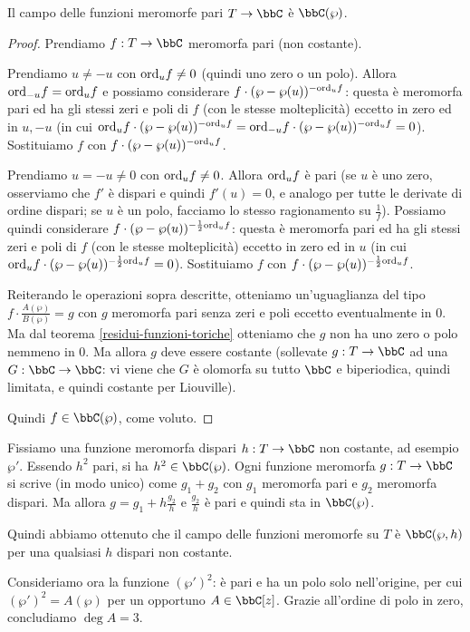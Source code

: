 \begin{teorema}
Il campo delle funzioni meromorfe pari $T\rar\bbC$ è $\bbC(\wp)$.
\end{teorema}
\begin{proof}
Prendiamo $f:T\rar\bbC$ meromorfa pari (non costante).

Prendiamo $u\not=-u$ con $\text{ord}_uf\not=0$ (quindi uno zero o un polo). Allora $\text{ord}_{-u}f=\text{ord}_uf$ e possiamo considerare $f\cdot(\wp-\wp(u))^{-\text{ord}_uf}$:
questa è meromorfa pari ed ha gli stessi zeri e poli di $f$ (con le stesse molteplicità) eccetto
in zero ed in $u,-u$ (in cui $\text{ord}_uf\cdot(\wp-\wp(u))^{-\text{ord}_uf}=\text{ord}_{-u}f\cdot(\wp-\wp(u))^{-\text{ord}_uf}=0$).
Sostituiamo $f$ con $f\cdot(\wp-\wp(u))^{-\text{ord}_uf}$.

Prendiamo $u=-u\not=0$ con $\text{ord}_uf\not=0$. Allora $\text{ord}_uf$ è pari (se $u$ è uno zero, osserviamo che $f'$ è dispari e quindi $f'(u)=0$, e analogo per tutte le derivate di ordine dispari;
se $u$ è un polo, facciamo lo stesso ragionamento su $\frac{1}{f}$). Possiamo quindi considerare $f\cdot(\wp-\wp(u))^{-\frac{1}{2}\text{ord}_uf}$:
questa è meromorfa pari ed ha gli stessi zeri e poli di $f$ (con le stesse molteplicità) eccetto in zero ed in $u$ (in cui $\text{ord}_uf\cdot(\wp-\wp(u))^{-\frac{1}{2}\text{ord}_uf}=0$).
Sostituiamo $f$ con $f\cdot(\wp-\wp(u))^{-\frac{1}{2}\text{ord}_uf}$.

Reiterando le operazioni sopra descritte, otteniamo un'uguaglianza del tipo $f\cdot\frac{A(\wp)}{B(\wp)}=g$ con $g$ meromorfa pari senza zeri e poli eccetto eventualmente in $0$.
Ma dal teorema \ref{residui-funzioni-toriche} otteniamo che $g$ non ha uno zero o polo nemmeno in $0$. Ma allora $g$ deve essere costante
(sollevate $g:T\rar\bbC$ ad una $G:\bbC\rar\bbC$: vi viene che $G$ è olomorfa su tutto $\bbC$ e biperiodica, quindi limitata, e quindi costante per Liouville).

Quindi $f\in\bbC(\wp)$, come voluto.
\end{proof}


Fissiamo una funzione meromorfa dispari $h:T\rar\bbC$ non costante, ad esempio $\wp'$.
Essendo $h^2$ pari, si ha $h^2\in\bbC(\wp)$.
Ogni funzione meromorfa $g:T\rar\bbC$ si scrive (in modo unico) come $g_1+g_2$ con $g_1$ meromorfa pari e $g_2$ meromorfa dispari.
Ma allora $g = g_1 + h \frac{g_2}{h}$ e $\frac{g_2}{h}$ è pari e quindi sta in $\bbC(\wp)$.

Quindi abbiamo ottenuto che il campo delle funzioni meromorfe su $T$ è $\bbC(\wp,h)$ per una qualsiasi $h$ dispari non costante.


Consideriamo ora la funzione $(\wp')^2$: è pari e ha un polo solo nell'origine, per cui $(\wp')^2 = A(\wp)$ per un opportuno $A \in \bbC[z]$. Grazie all'ordine di polo in zero, concludiamo $\deg A = 3$.
